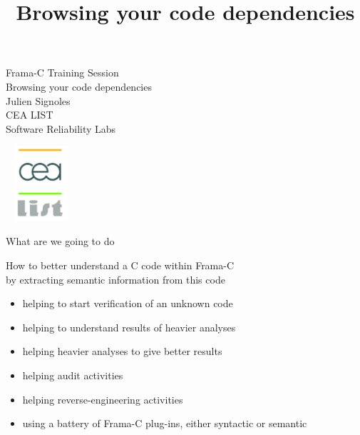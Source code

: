 \documentclass{beamer}
\title{Browsing your code dependencies}
\newcommand{\orange}[1]{{\textcolor{frama-c-1}{#1}}}
\newcommand{\orangepale}[1]{{\textcolor{frama-c-2}{#1}}}
\newcommand{\vvert}[1]{{\textcolor{vert}{#1}}}
\newcommand{\intro}[1]{\begin{center}\vvert{#1}\end{center}}
\newenvironment{sect}[1]{\orange{#1}\begin{itemize}}{\end{itemize}}
\begin{document}

\begin{frame}
  \begin{center}
    \orange{\LARGE Frama-C Training Session\\[0.5em]
      \Large Browsing your code dependencies\\[1.2em] 
    \vvert{\large Julien Signoles}\\[0.5em]
    \vvert{\Large CEA LIST}\\[0.5em]
    \vvert{\large Software Reliability Labs}}
  \end{center}

  \vspace{1.2em}
  ~\hfill
  \includegraphics[width=0.15\textwidth]{cealist.pdf}
  \hfill~
\end{frame}


\begin{frame}{What are we going to do}

  \intro{How to better understand a C code within \orangepale{Frama-C} \\
    by extracting semantic information from this code}

\begin{sect}{For what purpose}
\item helping to start verification of an unknown code
\item helping to understand results of heavier analyses
\item helping heavier analyses to give better results
\item helping audit activities 
\item helping reverse-engineering activities 
\end{sect}\smallskip

\begin{sect}{In what way}
\item using a \orangepale{battery of Frama-C plug-ins}, either syntactic or
  semantic
\end{sect}\medskip

\end{frame}
\end{document}
